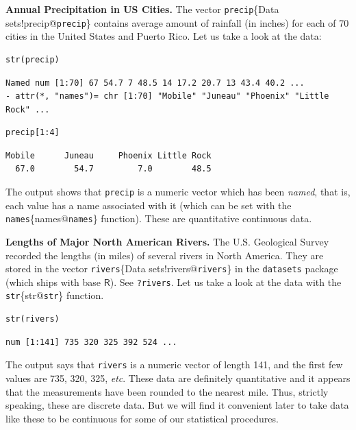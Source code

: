 \documentclass[10pt,english]{scrbook}
\begin{document}
\begin{exampletoo}
\textbf{Annual Precipitation in US Cities.} The vector \texttt{precip}\index\{Data sets!precip@\texttt{precip}\} contains average amount of rainfall (in inches) for each of 70 cities in the United States and Puerto Rico. Let us take a look at the data:

\begin{verbatim}
str(precip)
\end{verbatim}

\begin{verbatim}
Named num [1:70] 67 54.7 7 48.5 14 17.2 20.7 13 43.4 40.2 ...
- attr(*, "names")= chr [1:70] "Mobile" "Juneau" "Phoenix" "Little Rock" ...
\end{verbatim}

\begin{verbatim}
precip[1:4]
\end{verbatim}

\begin{verbatim}
Mobile      Juneau     Phoenix Little Rock 
  67.0        54.7         7.0        48.5
\end{verbatim}

The output shows that \texttt{precip} is a numeric vector which has been \emph{named}, that is, each value has a name associated with it (which can be set with the \texttt{names}\index\{names@\texttt{names}\} function). These are quantitative continuous data. 
\end{exampletoo}

\begin{exampletoo}

\textbf{Lengths of Major North American Rivers.} The U.S. Geological Survey recorded the lengths (in miles) of several rivers in North America. They are stored in the vector \texttt{rivers}\index\{Data sets!rivers@\texttt{rivers}\} in the \texttt{datasets} package \cite{datasets} (which ships with base \(\mathsf{R}\)). See \texttt{?rivers}. Let us take a look at the data with the \texttt{str}\index\{str@\texttt{str}\} function.

\begin{verbatim}
str(rivers)
\end{verbatim}

\begin{verbatim}
num [1:141] 735 320 325 392 524 ...
\end{verbatim}

The output says that \texttt{rivers} is a numeric vector of length 141, and the first few values are 735, 320, 325, \emph{etc}. These data are definitely quantitative and it appears that the measurements have been rounded to the nearest mile. Thus, strictly speaking, these are discrete data. But we will find it convenient later to take data like these to be continuous for some of our statistical procedures. 
\end{exampletoo}
\end{document}
